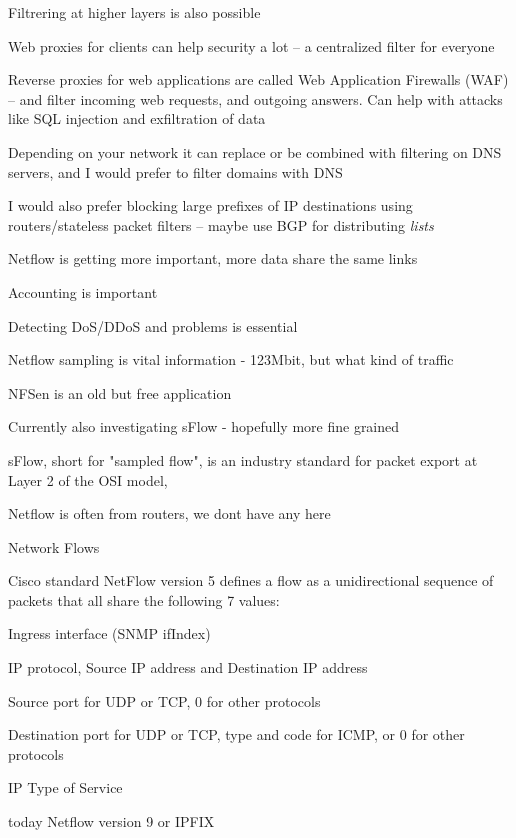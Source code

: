 \documentclass[Screen16to9,17pt]{foils}
\begin{document}
\begin{list2}
\item Filtrering at higher layers is also possible
\item Web proxies for clients can help security a lot -- a centralized filter for everyone

\item Reverse proxies for web applications are called
Web Application Firewalls (WAF) -- and filter incoming web requests, and outgoing answers. Can help with attacks like SQL injection and exfiltration of data
\item Depending on your network it can replace or be combined with filtering on DNS servers, and I would prefer to filter domains with DNS
\item I would also prefer blocking large prefixes of IP destinations using routers/stateless packet filters -- maybe use BGP for distributing \emph{lists}
\end{list2}



\begin{list2}
\item Netflow is getting more important, more data share the same links
\item Accounting is important
\item Detecting DoS/DDoS and problems is essential
\item Netflow sampling is vital information - 123Mbit, but what kind of traffic
\item NFSen is an old but free application
\item Currently also investigating sFlow - hopefully more fine grained
\item sFlow, short for "sampled flow", is an industry standard for packet export at Layer 2 of the OSI model, \\
\end{list2}

\centerline{Netflow is often from routers, we dont have any here}


\begin{list1}
\item Network Flows
\item Cisco standard NetFlow version 5 defines a flow as a unidirectional sequence of packets that all share the following 7 values:
\begin{list2}
\item Ingress interface (SNMP ifIndex)
\item IP protocol, Source IP address and Destination IP address
\item Source port for UDP or TCP, 0 for other protocols
\item Destination port for UDP or TCP, type and code for ICMP, or 0 for other protocols
\item IP Type of Service
\end{list2}
\item today Netflow version 9 or IPFIX
\end{list1}
\end{document}
